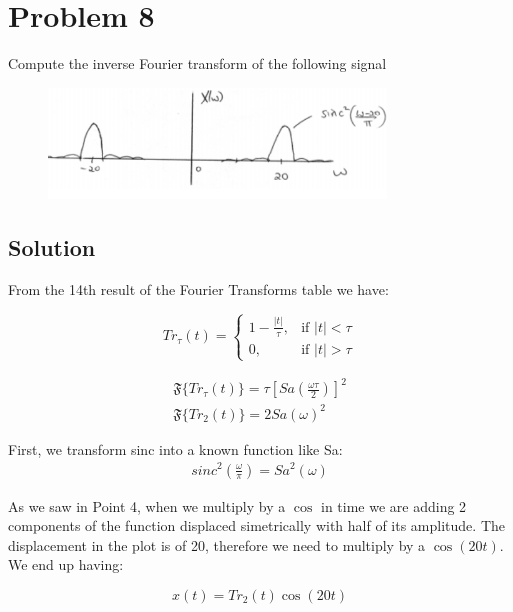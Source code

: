 \section*{Problem 8}

Compute the inverse Fourier transform of the following signal

\begin{figure}[H]
\caption*{}
\centering
\includegraphics[width=0.8\textwidth]{figs/c2p8.png}
\label{fig:c2p8}
\end{figure} 

\subsection*{Solution}

From the 14th result of the Fourier Transforms table we have:

\begin{equation*}
Tr_\tau(t) =
\begin{cases}
	1 - \frac{|t|}{\tau}  ,& \mbox{if } |t| < \tau \\
	0                     ,& \mbox{if } |t| > \tau
\end{cases}
\end{equation*}

\begin{equation}
\begin{aligned}
\mathfrak{F}\{Tr_\tau(t)\} = \tau \left[ Sa \left( \frac{\omega \tau}{2} \right) \right]^2 \\
\mathfrak{F}\{Tr_2(t)\} = 2 Sa(\omega)^2 
\label{eq:c2p5}
\end{aligned}
\end{equation} 

First, we transform sinc into a known function like Sa: 
\begin{equation*}
\begin{aligned}
sinc^2 \left( \frac{\omega}{\pi} \right) = Sa^2(\omega)
\end{aligned}
\end{equation*} 

As we saw in Point 4, when we multiply by a $\cos$ in time 
we are adding 2 components of the function displaced simetrically
with half of its amplitude. The displacement in the plot is
of 20, therefore we need to multiply by a $\cos(20t)$.
We end up having:

\begin{equation*}
x(t) = Tr_2(t) \cos(20t)
\end{equation*} 
